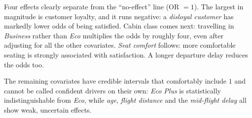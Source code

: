 Four effects clearly separate from the ``no-effect'' line (OR $=1$). The
largest in magnitude is customer loyalty, and it runs negative: a
\textit{disloyal customer} has markedly lower odds of being satisfied. Cabin
class comes next: travelling in \textit{Business} rather than \textit{Eco}
multiplies the odds by roughly four, even after adjusting for all the other
covariates. \textit{Seat comfort} follows: more comfortable seating is
strongly associated with satisfaction. A longer departure delay reduces the
odds too.

The remaining covariates have credible intervals that comfortably include $1$
and cannot be called confident drivers on their own: \textit{Eco Plus} is
statistically indistinguishable from \textit{Eco}, while \textit{age},
\textit{flight distance} and the \textit{mid-flight delay} all show
weak, uncertain effects.

